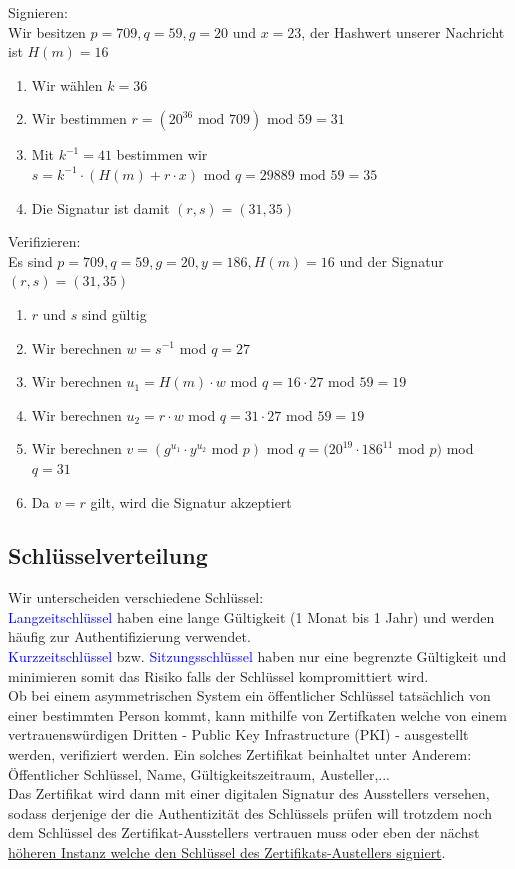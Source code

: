 \documentclass[a4paper,12pt,leqno]{article}
\newcommand{\blue}[1]{\textcolor{blue}{#1}}
\begin{document}
Signieren:\\
Wir besitzen $p=709,q=59,g=20$ und $x=23$, der Hashwert unserer Nachricht ist $H(m)=16$
\begin{enumerate}
\item Wir wählen $k=36$
\item Wir bestimmen $r=(20^{36}\textrm{ mod }709)\textrm{ mod }59=31$
\item Mit $k^{-1}=41$ bestimmen wir $s=k^{-1}\cdot (H(m)+r\cdot x)\textrm{ mod }q=29889\textrm{ mod }59=35$
\item Die Signatur ist damit $(r,s)=(31,35)$
\end{enumerate}

Verifizieren:\\
Es sind $p=709,q=59,g=20,y=186,H(m)=16$ und der Signatur $(r,s)=(31,35)$
\begin{enumerate}
\item $r$ und $s$ sind gültig
\item Wir berechnen $w=s^{-1}$ mod $q=27$
\item Wir berechnen $u_1=H(m)\cdot w$ mod $q=16\cdot 27$ mod $59=19$
\item Wir berechnen $u_2=r\cdot w$ mod $q=31\cdot 27$ mod $59=19$
\item Wir berechnen $v=(g^{u_1}\cdot y^{u_2}\textrm{ mod }p)$ mod $q=(20^{19}\cdot 186^{11}$ mod $p)$ mod $q =31$
\item Da $v=r$ gilt, wird die Signatur akzeptiert
\end{enumerate}

\subsection{Schlüsselverteilung}
\label{sec:Schlüsselverteilung}
Wir unterscheiden verschiedene Schlüssel:\\
\blue{Langzeitschlüssel} haben eine lange Gültigkeit (1 Monat bis 1 Jahr) und werden häufig zur Authentifizierung verwendet.\\
\blue{Kurzzeitschlüssel} bzw. \blue{Sitzungsschlüssel} haben nur eine begrenzte Gültigkeit und minimieren somit das Risiko falls der Schlüssel kompromittiert wird.\\

Ob bei einem asymmetrischen System ein öffentlicher Schlüssel tatsächlich von einer bestimmten Person kommt, kann mithilfe von Zertifkaten welche von einem vertrauenswürdigen Dritten - Public Key Infrastructure (PKI) - ausgestellt werden, verifiziert werden.
Ein solches Zertifikat beinhaltet unter Anderem: Öffentlicher Schlüssel, Name, Gültigkeitszeitraum, Austeller,...\\
Das Zertifikat wird dann mit einer digitalen Signatur des Ausstellers versehen, sodass derjenige der die Authentizität des Schlüssels prüfen will trotzdem noch dem Schlüssel des Zertifikat-Ausstellers vertrauen muss oder eben der nächst \hyperref[pic:Chainoftrust]{höheren Instanz welche den Schlüssel des Zertifikats-Austellers signiert}.
\end{document}
